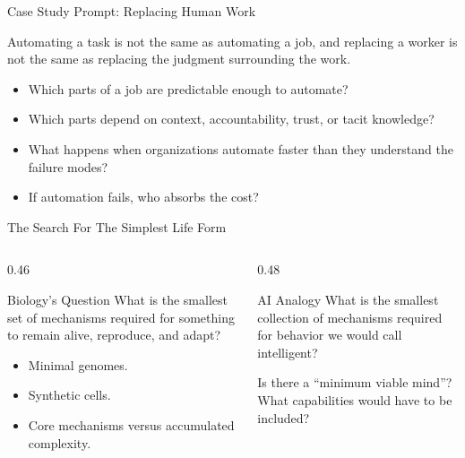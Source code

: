 \documentclass[aspectratio=169]{beamer}
\begin{document}
\begin{frame}{Case Study Prompt: Replacing Human Work}
  \begin{keyidea}
    Automating a task is not the same as automating a job, and replacing a worker is not the same as replacing the judgment surrounding the work.
  \end{keyidea}
  \vspace{0.14in}
  \begin{itemize}
    \item Which parts of a job are predictable enough to automate?
    \item Which parts depend on context, accountability, trust, or tacit knowledge?
    \item What happens when organizations automate faster than they understand the failure modes?
    \item If automation fails, who absorbs the cost?
  \end{itemize}
\end{frame}


\begin{frame}[shrink=4]{The Search For The Simplest Life Form}
  \begin{columns}[T,onlytextwidth]
    \begin{column}{0.46\textwidth}
      \begin{block}{Biology's Question}
        What is the smallest set of mechanisms required for something to remain alive, reproduce, and adapt?
      \end{block}
      \begin{itemize}
        \item Minimal genomes.
        \item Synthetic cells.
        \item Core mechanisms versus accumulated complexity.
      \end{itemize}
    \end{column}
    \begin{column}{0.48\textwidth}
      \begin{block}{AI Analogy}
        What is the smallest collection of mechanisms required for behavior we would call intelligent?
      \end{block}
      \begin{activity}
        Is there a ``minimum viable mind''? What capabilities would have to be included?
      \end{activity}
    \end{column}
  \end{columns}
\end{frame}
\end{document}

